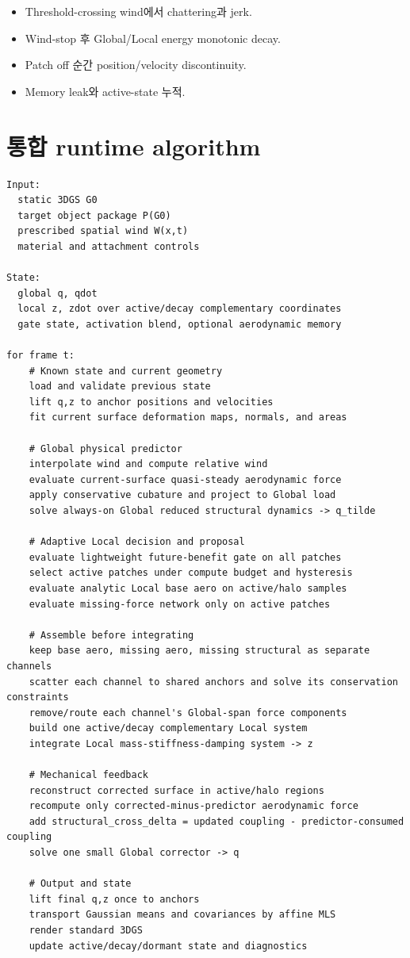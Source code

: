 \documentclass[11pt,a4paper]{article}
\begin{document}
\begin{itemize}[leftmargin=1.5em]
  \item Threshold-crossing wind에서 chattering과 jerk.
  \item Wind-stop 후 Global/Local energy monotonic decay.
  \item Patch off 순간 position/velocity discontinuity.
  \item Memory leak와 active-state 누적.
\end{itemize}

\section{통합 runtime algorithm}

\begin{lstlisting}
Input:
  static 3DGS G0
  target object package P(G0)
  prescribed spatial wind W(x,t)
  material and attachment controls

State:
  global q, qdot
  local z, zdot over active/decay complementary coordinates
  gate state, activation blend, optional aerodynamic memory

for frame t:
    # Known state and current geometry
    load and validate previous state
    lift q,z to anchor positions and velocities
    fit current surface deformation maps, normals, and areas

    # Global physical predictor
    interpolate wind and compute relative wind
    evaluate current-surface quasi-steady aerodynamic force
    apply conservative cubature and project to Global load
    solve always-on Global reduced structural dynamics -> q_tilde

    # Adaptive Local decision and proposal
    evaluate lightweight future-benefit gate on all patches
    select active patches under compute budget and hysteresis
    evaluate analytic Local base aero on active/halo samples
    evaluate missing-force network only on active patches

    # Assemble before integrating
    keep base aero, missing aero, missing structural as separate channels
    scatter each channel to shared anchors and solve its conservation constraints
    remove/route each channel's Global-span force components
    build one active/decay complementary Local system
    integrate Local mass-stiffness-damping system -> z

    # Mechanical feedback
    reconstruct corrected surface in active/halo regions
    recompute only corrected-minus-predictor aerodynamic force
    add structural_cross_delta = updated coupling - predictor-consumed coupling
    solve one small Global corrector -> q

    # Output and state
    lift final q,z once to anchors
    transport Gaussian means and covariances by affine MLS
    render standard 3DGS
    update active/decay/dormant state and diagnostics
\end{lstlisting}
\end{document}
